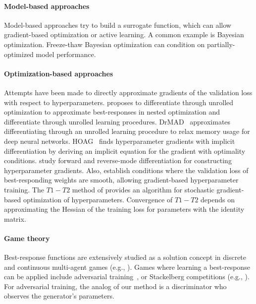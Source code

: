 \documentclass{article} %
\begin{document}
\paragraph{Model-based approaches}
Model-based approaches try to build a surrogate function, which can allow gradient-based optimization or active learning.
A common example is Bayesian optimization.
Freeze-thaw Bayesian optimization can condition on partially-optimized model performance.

\paragraph{Optimization-based approaches}
Attempts have been made to directly approximate gradients of the validation loss with respect to hyperparameters.
\citet{domke2012generic} proposes to differentiate through unrolled optimization to approximate best-responses in nested optimization and \citet{maclaurin2015gradient} differentiate through unrolled learning procedures.
DrMAD~\citep{fu2016drmad} approximates differentiating through an unrolled learning procedure to relax memory usage for deep neural networks.
HOAG~\citep{pedregosa2016hyperparameter} finds hyperparameter gradients with implicit differentiation by deriving an implicit equation for the gradient with optimality conditions.
\citet{franceschi2017forward} study forward and reverse-mode differentiation for constructing hyperparameter gradients.
Also, \citet{feng2017gradient} establish conditions where the validation loss of best-responding weights are smooth, allowing gradient-based hyperparameter training. 
The $T1 - T2$ method of \citet{luketina2016scalable} provides an algorithm for stochastic gradient-based optimization of hyperparameters.
Convergence of  $T1 - T2$ depends on approximating the Hessian of the training loss for parameters with the identity matrix.

\paragraph{Game theory}
Best-response functions are extensively studied as a solution concept in discrete and continuous multi-agent games (e.g., \citet{fudenberg1998theory}).
Games where learning a best-response can be applied include adversarial training~\citep{goodfellow2014generative}, or Stackelberg competitions (e.g., \citet{bruckner2011stackelberg}).
For adversarial training, the analog of our method is a discriminator who observes the generator's parameters.
\end{document}
